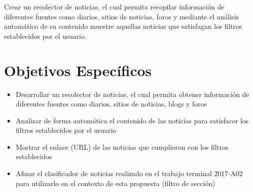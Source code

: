   Crear un recolector de noticias, el cual permita recopilar información de diferentes fuentes como diarios, sitios de noticias, foros y mediante el análisis automático de su contenido muestre aquellas noticias que satisfagan los filtros establecidos por el usuario.
  

\section{Objetivos Específicos}
\begin{itemize}
  \item Desarrollar un recolector de noticias, el cual permita obtener información de diferentes fuentes como diarios, sitios de noticias, blogs y foros
  \item Analizar de forma automática el contenido de las noticias para satisfacer los filtros establecidos por el usuario
  \item Mostrar el enlace (URL) de las noticias que cumplieron con los filtros establecidos
  \item Afinar el clasificador de noticias realizado en el trabajo terminal 2017-A02 para utilizarlo en el contexto de esta propuesta (filtro de sección) 

\end{itemize}